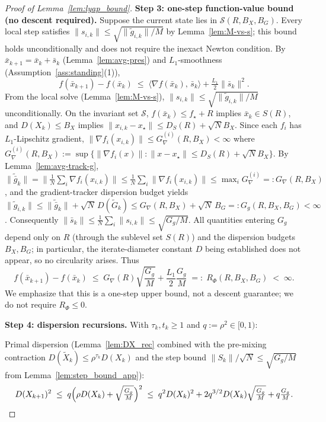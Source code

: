 \documentclass[review,onefignum,onetabnum]{siamart171218}
\begin{document}
\begin{proof}[Proof of Lemma~\ref{lem:lyap_bound}]
		\smallskip
		\noindent\textbf{Step 3: one-step function-value bound (no descent required).}
		Suppose the current state lies in $\mathcal S(R,B_X,B_G)$.
		Every local step satisfies $\|s_{i,k}\|\le\sqrt{\|\tilde g_{i,k}\|/M}$
		by Lemma~\ref{lem:M-vs-s}; this bound holds unconditionally
		and does not require the inexact Newton condition.
		By $\bar x_{k+1}=\bar x_k+\bar s_k$ (Lemma~\ref{lem:avg-pres}) and
		$L_1$-smoothness (Assumption~\ref{ass:standing}(1)),
		\[
		f(\bar x_{k+1})-f(\bar x_k)
		\;\le\;
		\langle \nabla f(\bar x_k),\,\bar s_k\rangle
		+\tfrac{L_1}{2}\|\bar s_k\|^2.
		\]
		From the local solve (Lemma~\ref{lem:M-vs-s}),
		$\|s_{i,k}\|\le\sqrt{\|\tilde g_{i,k}\|/M}$ unconditionally.
		On the invariant set $\mathcal S$,
		$f(\bar x_k)\le f_\star+R$ implies $\bar x_k\in S(R)$, and
		$D(X_k)\le B_X$ implies $\|x_{i,k}-x_\star\|\le D_S(R)+\sqrt{N}B_X$.
		Since each $f_i$ has $L_1$-Lipschitz gradient,
		$\|\nabla f_i(x_{i,k})\|\le G_\nabla^{(i)}(R,B_X)<\infty$
		where $G_\nabla^{(i)}(R,B_X):=\sup\{\|\nabla f_i(x)\|:\|x-x_\star\|\le D_S(R)+\sqrt{N}B_X\}$.
		By Lemma~\ref{lem:avg-track-g},
		$\|\tilde{\bar g}_k\|=\|\frac1N\sum_i\nabla f_i(x_{i,k})\|
		\le \frac1N\sum_i\|\nabla f_i(x_{i,k})\|\le \max_i G_\nabla^{(i)}=:G_\nabla(R,B_X)$,
		and the gradient-tracker dispersion budget yields
		$\|\tilde g_{i,k}\|\le \|\tilde{\bar g}_k\|+\sqrt{N}\,D(\tilde G_k)
		\le G_\nabla(R,B_X)+\sqrt{N}\,B_G=:G_g(R,B_X,B_G)<\infty$.
		Consequently $\|\bar s_k\|\le\frac{1}{N}\sum_i\|s_{i,k}\|
		\le\sqrt{G_g/M}$.
		All quantities entering $G_g$ depend only on $R$ (through the
		sublevel set $S(R)$) and the dispersion budgets $B_X,B_G$;
		in particular, the iterate-diameter constant $D$ being established
		does not appear, so no circularity arises.
		Thus
		\begin{equation}\label{eq:rphi_R}
			f(\bar x_{k+1})-f(\bar x_k)
			\;\le\;
			G_\nabla(R)\sqrt{\frac{G_g}{M}}+\frac{L_1}{2}\frac{G_g}{M}
			\;=:\; R_\Phi(R,B_X,B_G) \;<\;\infty.
		\end{equation}
		We emphasize that this is a one-step upper bound, not a descent
		guarantee; we do not require $R_\Phi\le 0$.
		
		\smallskip
		\noindent\textbf{Step 4: dispersion recursions.}
		With $\tau_k,t_k\ge1$ and $q:=\rho^2\in[0,1)$:
		
		Primal dispersion (Lemma~\ref{lem:DX_rec} combined with the
		pre-mixing contraction $D(\tilde X_k)\le \rho^{\tau_k}D(X_k)$ and the
		step bound $\|S_k\|/\sqrt{N}\le \sqrt{G_g/M}$ from
		Lemma~\ref{lem:step_bound_app}):
		\[
		D(X_{k+1})^2
		\;\le\; q\Bigl(\rho D(X_k)+\sqrt{\tfrac{G_g}{M}}\Bigr)^2
		\;\le\; q^2 D(X_k)^2 + 2q^{3/2}D(X_k)\sqrt{\tfrac{G_g}{M}}+q\tfrac{G_g}{M}.
		\]
		

\end{proof}
\end{document}

